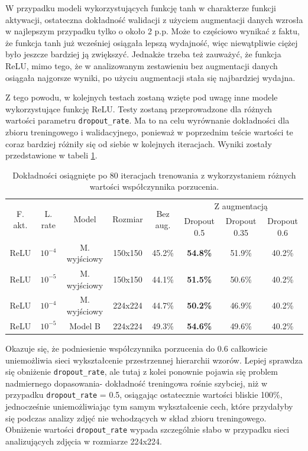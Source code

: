 W przypadku modeli wykorzystujących funkcję tanh w charakterze funkcji aktywacji, ostateczna dokładność walidacji z użyciem augmentacji danych wzrosła w najlepszym przypadku tylko o około 2 p.p. Może to częściowo wynikać z faktu, że funkcja tanh już wcześniej osiągała lepszą wydajność, więc niewątpliwie ciężej było jeszcze bardziej ją zwiększyć. Jednakże trzeba też zauważyć, że funkcja ReLU, mimo tego, że w analizowanym zestawieniu bez augmentacji danych osiągała najgorsze wyniki, po użyciu augmentacji stała się najbardziej wydajna.

Z tego powodu, w kolejnych testach zostaną wzięte pod uwagę inne modele wykorzystujące funkcję ReLU. Testy zostaną przeprowadzone dla różnych wartości parametru \verb|dropout_rate|. Ma to na celu wyrównanie dokładności dla zbioru treningowego i walidacyjnego, ponieważ w poprzednim teście wartości te coraz bardziej różniły się od siebie w kolejnych iteracjach. Wyniki zostały przedstawione w tabeli \ref{tab:5.8}.

\begin{table}[H]
  \centering
  \caption{Dokładności osiągnięte po 80 iteracjach trenowania z wykorzystaniem różnych wartości współczynnika porzucenia.}
    \begin{tabular}{ |c|c|c|c|c|c|c|c| }
    \hline
    \multirow{2}{*}{F. akt.} & \multirow{2}{*}{L. rate} & \multirow{2}{*}{Model} & \multirow{2}{*}{Rozmiar} & \multirow{2}{*}{Bez aug.} & \multicolumn{3}{c|}{Z augmentacją} \\
    \cline{6-8}
    &&&&& Dropout 0.5 & Dropout 0.35 & Dropout 0.6 \\
    \hline
    ReLU & $10^{-4}$ & M. wyjściowy & 150x150 & 45.2\% & \textbf{54.8\%} & 51.9\% & 40.2\% \\
    ReLU & $10^{-5}$ & M. wyjściowy & 150x150 & 44.1\% & \textbf{51.5\%} & 50.6\% & 40.2\% \\
    
    ReLU & $10^{-4}$ & M. wyjściowy & 224x224 & 44.7\% & \textbf{50.2\%} & 46.9\% & 40.2\% \\
    ReLU & $10^{-5}$ & Model B & 224x224 & 49.3\% & \textbf{54.6\%} & 49.6\% & 40.2\% \\
    \hline
    \end{tabular}
  \label{tab:5.8}
\end{table}

Okazuje się, że podniesienie współczynnika porzucenia do 0.6 całkowicie uniemożliwia sieci wykształcenie przestrzennej hierarchii wzorów. Lepiej sprawdza się obniżenie \verb|dropout_rate|, ale tutaj z kolei ponownie pojawia się problem nadmiernego dopasowania- dokładność treningowa rośnie szybciej, niż w przypadku \verb|dropout_rate| = 0.5, osiągając ostatecznie wartości bliskie 100\%, jednocześnie uniemożliwiając tym samym wykształcenie cech, które przydałyby się podczas analizy zdjęć nie wchodzących w skład zbioru treningowego. Obniżenie wartości \verb|dropout_rate| wypada szczególnie słabo w przypadku sieci analizujących zdjęcia w rozmiarze 224x224.

